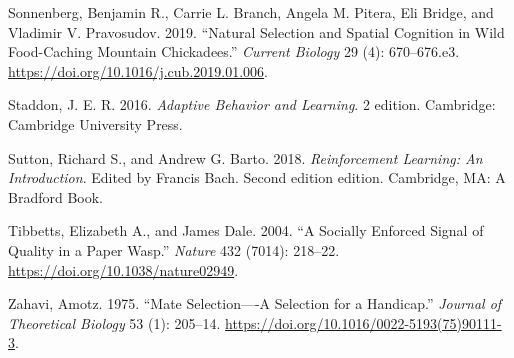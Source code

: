 \documentclass[
  12pt,
]{article}
\newlength{\cslhangindent}
\newlength{\cslentryspacingunit} %
\newenvironment{CSLReferences}[2] %
 {%
  \setlength{\parindent}{0pt}
  \ifodd #1
  \let\oldpar\par
  \def\par{\hangindent=\cslhangindent\oldpar}
  \fi
  \setlength{\parskip}{#2\cslentryspacingunit}
 }%
 {}
\begin{document}
\begin{CSLReferences}{1}{0}
\leavevmode{}%
Sonnenberg, Benjamin R., Carrie L. Branch, Angela M. Pitera, Eli Bridge,
and Vladimir V. Pravosudov. 2019. {``Natural {Selection} and {Spatial}
{Cognition} in {Wild} {Food}-{Caching} {Mountain} {Chickadees}.''}
\emph{Current Biology} 29 (4): 670--676.e3.
\url{https://doi.org/10.1016/j.cub.2019.01.006}.

\leavevmode{}%
Staddon, J. E. R. 2016. \emph{Adaptive {Behavior} and {Learning}}. 2
edition. Cambridge: Cambridge University Press.

\leavevmode{}%
Sutton, Richard S., and Andrew G. Barto. 2018. \emph{Reinforcement
{Learning}: {An} {Introduction}}. Edited by Francis Bach. Second edition
edition. Cambridge, MA: A Bradford Book.

\leavevmode{}%
Tibbetts, Elizabeth A., and James Dale. 2004. {``A Socially Enforced
Signal of Quality in a Paper Wasp.''} \emph{Nature} 432 (7014): 218--22.
\url{https://doi.org/10.1038/nature02949}.

\leavevmode{}%
Zahavi, Amotz. 1975. {``Mate Selection----{A} Selection for a
Handicap.''} \emph{Journal of Theoretical Biology} 53 (1): 205--14.
\url{https://doi.org/10.1016/0022-5193(75)90111-3}.

\end{CSLReferences}
\end{document}
